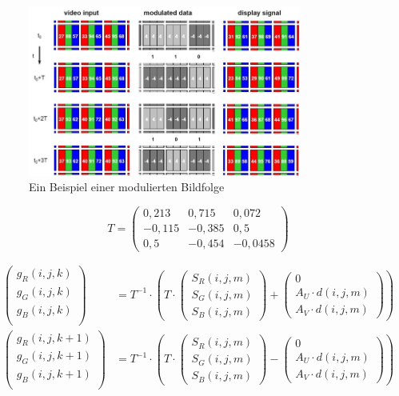 \begin{figure}[htb]
	\centering 
	\includegraphics[keepaspectratio,width=0.8\textwidth]{images/David4.jpg}
	\caption{Ein Beispiel einer modulierten Bildfolge}
	\label{fig:David4}
\end{figure}


\begin{equation}
   T = \begin{pmatrix}
   0,213 & 0,715 & 0,072 \\
   -0,115& -0,385& 0,5	\\
   0,5   & -0,454& -0,0458
\end{pmatrix}  
\end{equation}


\begin{equation}
\begin{split}
  \begin{pmatrix}
  g_R(i,j,k) \\
  g_G(i,j,k) \\
  g_B(i,j,k) \\
\end{pmatrix} &= T^{-1} \cdot \left( T \cdot \begin{pmatrix}
  S_R(i,j,m) \\
  S_G(i,j,m) \\
  S_B(i,j,m) 
  \end{pmatrix}  + \begin{pmatrix}
  0 \\
  A_U \cdot d(i,j,m) \\
  A_V \cdot d(i,j,m) 
  \end{pmatrix} \right) \\  
  \begin{pmatrix}
  g_R(i,j,k+1) \\
  g_G(i,j,k+1) \\
  g_B(i,j,k+1) \\
\end{pmatrix} &= T^{-1} \cdot \left( T \cdot \begin{pmatrix}
  S_R(i,j,m) \\
  S_G(i,j,m) \\
  S_B(i,j,m) 
  \end{pmatrix}  - \begin{pmatrix}
  0 \\
  A_U \cdot d(i,j,m) \\
  A_V \cdot d(i,j,m) 
  \end{pmatrix} \right) \\ 
\end{split}
\end{equation}


